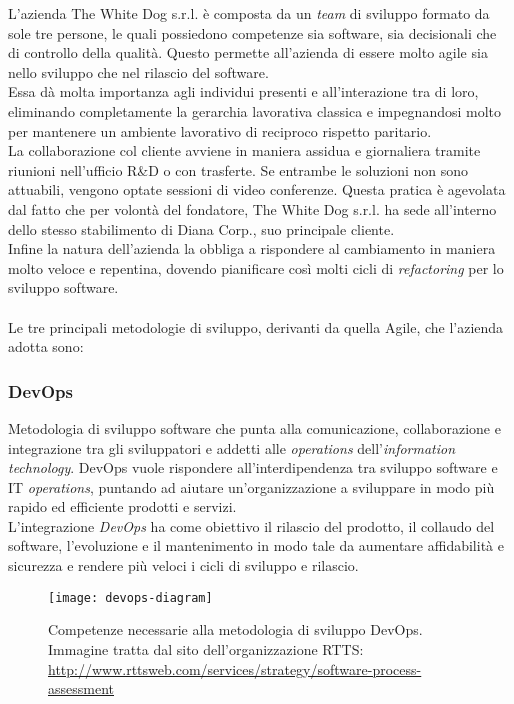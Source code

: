L'azienda The White Dog s.r.l. è composta da un \textit{team} di sviluppo formato da sole tre persone, le quali possiedono competenze sia software, sia decisionali che di controllo della qualità. Questo permette all'azienda di essere molto agile sia nello sviluppo che nel rilascio del software. \\ 
Essa dà molta importanza agli individui presenti e all'interazione tra di loro, eliminando completamente la gerarchia lavorativa classica e impegnandosi molto per mantenere un ambiente lavorativo di reciproco rispetto paritario. \\
La collaborazione col cliente avviene in maniera assidua e giornaliera tramite riunioni nell'ufficio R\&D o con trasferte. Se entrambe le soluzioni non sono attuabili, vengono optate sessioni di video conferenze. Questa pratica è agevolata dal fatto che per volontà del fondatore, The White Dog s.r.l. ha sede all'interno dello stesso stabilimento di Diana Corp., suo principale cliente. \\
Infine la natura dell'azienda la obbliga a rispondere al cambiamento in maniera molto veloce e repentina, dovendo pianificare così molti cicli di \textit{refactoring} per lo sviluppo software. \\ \\

Le tre principali metodologie di sviluppo, derivanti da quella Agile, che l'azienda adotta sono:

\subsubsection{DevOps}

Metodologia di sviluppo software che punta alla comunicazione, collaborazione e integrazione tra gli sviluppatori e addetti alle \textit{operations} dell'\textit{information technology}. DevOps vuole rispondere all'interdipendenza tra sviluppo software e IT \textit{operations}, puntando ad aiutare un'organizzazione a sviluppare in modo più rapido ed efficiente prodotti e servizi. \\
L'integrazione \textit{DevOps} ha come obiettivo il rilascio del prodotto, il collaudo del software, l'evoluzione e il mantenimento in modo tale da aumentare affidabilità e sicurezza e rendere più veloci i cicli di sviluppo e rilascio. 

\label{DevOps}
\begin{figure}[ht]
	\begin{center}
		\texttt{[image: devops-diagram]}
		\caption{Competenze necessarie alla metodologia di sviluppo DevOps. Immagine tratta dal sito dell'organizzazione RTTS: \url{http://www.rttsweb.com/services/strategy/software-process-assessment}}
	\end{center}
\end{figure}
\FloatBarrier

